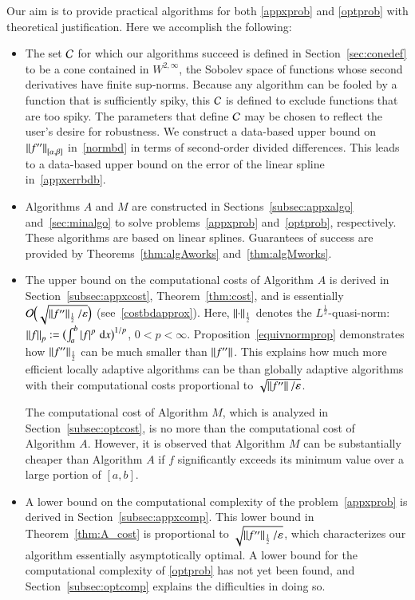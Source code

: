 \documentclass[review]{elsarticle}
\newcommand{\abstol}{\varepsilon}
\theoremstyle{definition}
\renewcommand{\cw}{W}
\begin{document}
Our aim is to provide practical algorithms for both \eqref{appxprob} and  \eqref{optprob} with theoretical justification.  Here we accomplish the following:
\begin{itemize}

\item The set $\cc$ for which our algorithms succeed is defined in Section~\ref{sec:conedef} to be a cone contained in $\cw^{2,\infty}$, the Sobolev space of functions whose second derivatives have finite sup-norms.  Because any algorithm can be fooled by a function that is sufficiently spiky, this $\cc$ is defined to exclude functions that are too spiky.  The parameters that define $\cc$ may be chosen to reflect the user's desire for robustness.  We construct a data-based upper bound on $\norm[{[\alpha,\beta]}]{f''}$ in~\eqref{normbd} in terms of second-order divided differences.  This leads to a data-based upper bound on the error of the linear spline in~\eqref{appxerrbdb}.

\item Algorithms $A$ and $M$ are constructed in Sections~\ref{subsec:appxalgo} and~\ref{sec:minalgo} to solve problems~\eqref{appxprob}
and~\eqref{optprob}, respectively.  These algorithms are based on linear splines.  Guarantees of success are provided by Theorems~\ref{thm:algAworks}
and~\ref{thm:algMworks}.

\item The upper bound on the computational costs of Algorithm $A$ is derived in Section~\ref{subsec:appxcost},  Theorem~\ref{thm:cost}, and is essentially $\Order\Bigl(\sqrt{\norm[\frac12]{f''}/\abstol}\Bigr)$ (see~\eqref{costbdapprox}).  Here, $\norm[\frac12]{\cdot}$ denotes the $L^{\frac12}$-quasi-norm:  $\norm[p]{f} := \bigl(\int_a^b \abs{f}^p \, \dif x \bigr)^{1/p}$, $0 < p < \infty$.  Proposition~\ref{equivnormprop} demonstrates how $\norm[\frac12]{f''}$ can be much smaller than $\norm{f''}$.  This explains how much more efficient locally adaptive algorithms can be than globally adaptive algorithms with their computational costs  proportional to $\sqrt{\norm{f''}/\abstol}$.

The computational cost of Algorithm $M$, which is analyzed in Section~\ref{subsec:optcost}, is no more than the computational cost of Algorithm $A$.  However, it is observed that Algorithm $M$ can be substantially cheaper than Algorithm $A$ if $f$ significantly exceeds its minimum value over a large portion of $[a,b]$.

\item A lower bound on the computational complexity of the problem~\eqref{appxprob} is derived in Section~\ref{subsec:appxcomp}.  This lower bound in Theorem~\ref{thm:A_cost} is proportional to $\sqrt{\norm[\frac12]{f''}/\abstol}$, which characterizes our algorithm essentially asymptotically optimal.  A lower bound for the computational complexity of  \eqref{optprob} has not yet been found, and Section~\ref{subsec:optcomp} explains the difficulties in doing so.


\end{itemize}
\end{document}
